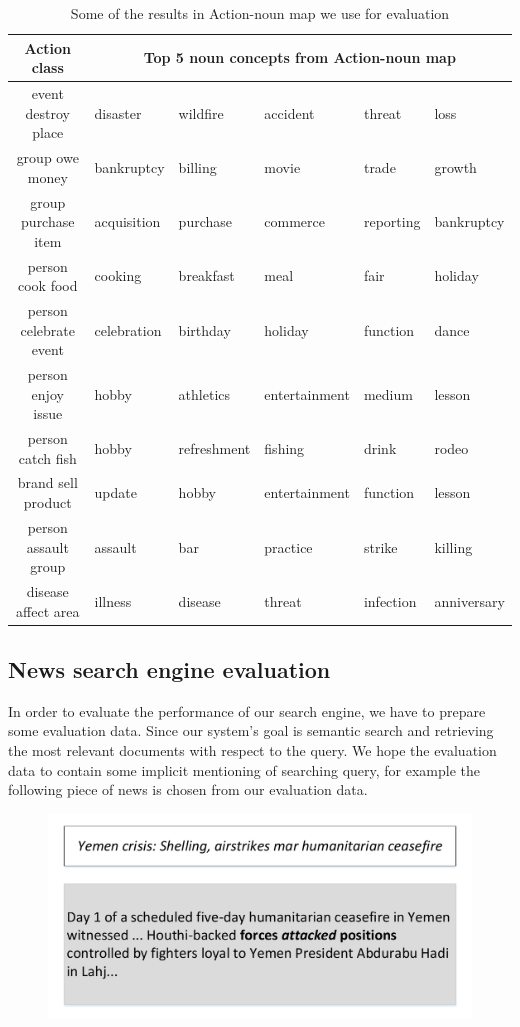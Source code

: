 \begin{table}[th]
    \centering
    \caption{ Some of the results in Action-noun map we use for evaluation  }
    \begin{tabular} {|c|p{2cm}|p{2cm}|p{2cm}|p{2cm}|p{2cm}|}
    \hline
    Action class & \multicolumn{5}{c|}{Top 5 noun concepts from Action-noun map} \\
    \hline \hline
    event destroy place & disaster & wildfire & accident & threat & loss \\
    \hline
    group owe money & bankruptcy & billing & movie & trade & growth \\
    \hline
    group purchase item & acquisition & purchase & commerce & reporting & bankruptcy\\
    \hline
    person cook food & cooking & breakfast & meal & fair & holiday\\
    \hline
    person celebrate event &  celebration & birthday & holiday & function & dance\\
    \hline
    person enjoy issue &  hobby & athletics & entertainment & medium & lesson\\
    \hline
    person catch fish &  hobby & refreshment & fishing & drink & rodeo\\
    \hline
    brand sell product & update & hobby & entertainment & function & lesson\\
    \hline
    person assault group & assault & bar & practice & strike & killing\\
    \hline
    disease affect area &  illness & disease & threat & infection & anniversary\\
    \hline
    \end{tabular}
\end{table}

\subsection{News search engine evaluation}
In order to evaluate the performance of our search engine, we have to prepare some evaluation data. Since our system's goal is
semantic search and retrieving the most relevant documents with respect to the query. We hope the evaluation data to contain
some implicit mentioning of searching query, for example the following piece of news is chosen from our evaluation data.

\begin{figure}[!htp]
 \centering
 \includegraphics[width=\linewidth]{img/news.pdf}
\end{figure}


